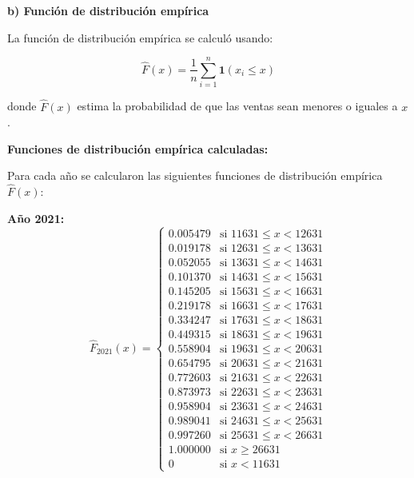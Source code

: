 \documentclass[11pt,a4paper]{article}
\begin{document}
\textbf{b) Función de distribución empírica}

La función de distribución empírica se calculó usando:

\[
\hat{F}(x) = \frac{1}{n} \sum_{i=1}^{n} \mathbf{1}(x_i \leq x)
\]

donde $\hat{F}(x)$ estima la probabilidad de que las ventas sean menores o iguales a $x$.

\textbf{Funciones de distribución empírica calculadas:}

Para cada año se calcularon las siguientes funciones de distribución empírica $\hat{F}(x)$:

\textbf{Año 2021:}
\[
\hat{F}_{2021}(x) = \begin{cases}
0.005479 & \text{si } 11631 \leq x < 12631 \\
0.019178 & \text{si } 12631 \leq x < 13631 \\
0.052055 & \text{si } 13631 \leq x < 14631 \\
0.101370 & \text{si } 14631 \leq x < 15631 \\
0.145205 & \text{si } 15631 \leq x < 16631 \\
0.219178 & \text{si } 16631 \leq x < 17631 \\
0.334247 & \text{si } 17631 \leq x < 18631 \\
0.449315 & \text{si } 18631 \leq x < 19631 \\
0.558904 & \text{si } 19631 \leq x < 20631 \\
0.654795 & \text{si } 20631 \leq x < 21631 \\
0.772603 & \text{si } 21631 \leq x < 22631 \\
0.873973 & \text{si } 22631 \leq x < 23631 \\
0.958904 & \text{si } 23631 \leq x < 24631 \\
0.989041 & \text{si } 24631 \leq x < 25631 \\
0.997260 & \text{si } 25631 \leq x < 26631 \\
1.000000 & \text{si } x \geq 26631 \\
0 & \text{si } x < 11631
\end{cases}
\]
\end{document}
